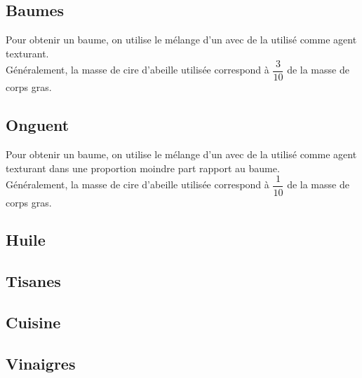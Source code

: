 \subsection{Baumes}

\begin{Defi}[Baume]
    Pour obtenir un baume, on utilise le mélange d'un  avec de la  utilisé comme agent texturant.\\

    Généralement, la masse de cire d'abeille utilisée correspond à $\dfrac{3}{10}$ de la masse de corps gras. 
\end{Defi}



\subsection{Onguent}

\begin{Defi}[Onguent]
    Pour obtenir un baume, on utilise le mélange d'un  avec de la  utilisé comme agent texturant dans une proportion moindre part rapport au baume.\\

    Généralement, la masse de cire d'abeille utilisée correspond à $\dfrac{1}{10}$ de la masse de corps gras. 
\end{Defi}

\subsection{Huile}

\subsection{Tisanes}

\subsection{Cuisine}

\subsection{Vinaigres}

    
